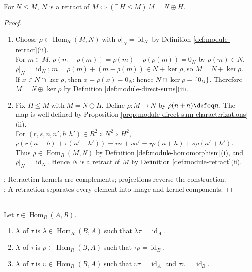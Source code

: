 \begin{corollary} \label{cor:retract-iff-direct-summand-module} \\
For $N\leq M$, $N$ is a retract of $M\Longleftrightarrow(\exists\,H\leq M)\,M=N\oplus H$.
\begin{proof}
\begin{enumerate}[label=\roman*.]
\setlength{\itemsep}{0pt}
\item[$(\Rightarrow)$] Choose $\rho\in\operatorname{Hom}_R(M,N)$ with $\rho|_N=\operatorname{id}_N$ by Definition \ref{def:module-retract}(ii).\\
For $m\in M$, $\rho(m-\rho(m))=\rho(m)-\rho(\rho(m))=0_N$ by $\rho(m)\in N$, $\rho|_N=\operatorname{id}_N$; $m=\rho(m)+(m-\rho(m))\in N+\ker\rho$, so $M=N+\ker\rho$.\\
If $x\in N\cap\ker\rho$, then $x=\rho(x)=0_N$; hence $N\cap\ker\rho=\{0_M\}$. Therefore $M=N\oplus\ker\rho$ by Definition \ref{def:module-direct-sums}(ii).
\item[$(\Leftarrow)$] Fix $H\leq M$ with $M=N\oplus H$. Define $\rho:M\to N$ by $\rho(n+h)\defeq n$. The map is well-defined by Proposition \ref{prop:module-direct-sum-characterizations}(ii).\\
For $(r,s,n,n',h,h')\in R^2\times N^2\times H^2$, $\rho(r(n+h)+s(n'+h'))=rn+sn'=r\rho(n+h)+s\rho(n'+h')$.\\
Thus $\rho\in\operatorname{Hom}_R(M,N)$ by Definition \ref{def:module-homomorphism}(i), and $\rho|_N=\operatorname{id}_N$. Hence $N$ is a retract of $M$ by Definition \ref{def:module-retract}(ii).
\end{enumerate}
: Retraction kernels are complements; projections reverse the construction.\\
: A retraction separates every element into image and kernel components.
\end{proof}
\end{corollary}

\begin{definition} \label{def:one-sided-inverses-module-maps} \\
Let $\tau\in\operatorname{Hom}_R(A,B)$.
\begin{enumerate}[label=(\roman*)]
\setlength{\itemsep}{0pt}
\item A  of $\tau$ is $\lambda\in\operatorname{Hom}_R(B,A)$ such that $\lambda\tau=\operatorname{id}_A$.
\item A  of $\tau$ is $\rho\in\operatorname{Hom}_R(B,A)$ such that $\tau\rho=\operatorname{id}_B$.
\item A  of $\tau$ is $\upsilon\in\operatorname{Hom}_R(B,A)$ such that $\upsilon\tau=\operatorname{id}_A$ and $\tau\upsilon=\operatorname{id}_B$.
\end{enumerate}
\end{definition}

